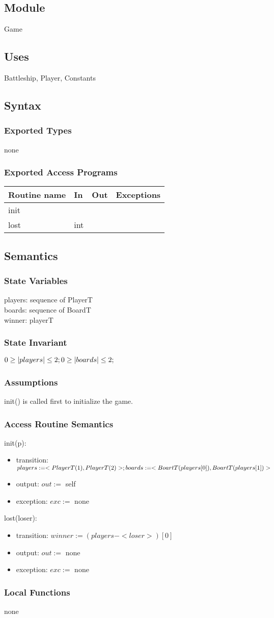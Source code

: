 \documentclass[12pt]{article}
\newcommand{\newModule}[9]{
	\subsection* {Module}
		#1
	\subsection* {Uses}
		#2
	\subsection* {Syntax}
		\subsubsection* {Exported Types}
			#3
		\subsubsection* {Exported Access Programs}
			#4
	\subsection* {Semantics}
		\subsubsection* {State Variables}
			#5
		\subsubsection* {State Invariant}
			#6
		\subsubsection* {Assumptions}
			#7
		\subsubsection* {Access Routine Semantics}
			#8
		\subsubsection* {Local Functions}
			#9
}
\newcommand{\newAccessProgram}[4]{
	\noindent #1:
		\begin{itemize}
			\item transition: #2
			\item output: $out :=$ #3
			\item exception: $exc :=$ #4
		\end{itemize}
}
\newcommand{\row}[4]{#1 & #2 & #3 & #4 ~\\ \hline}
\newcommand{\accessProgramsTableStart}{
\begin{tabular}{| l | l | l | l |}
\hline
\textbf{Routine name} & \textbf{In} & \textbf{Out} & \textbf{Exceptions}\\
\hline
}
\newcommand{\accessProgramsTableEnd}{
	\end{tabular}
}
\begin{document}
\newModule{Game}
	{%
		Battleship, Player, Constants
	}
	{%
		none
	}
	{%
		\accessProgramsTableStart
			\row{init}{}{}{}
			\row{lost}{int}{}{}
		\accessProgramsTableEnd
	}
	{%
		players: sequence of PlayerT \\
		boards: sequence of BoardT \\
		winner: playerT \\
	}
	{%
		$0 \geq |players| \leq 2; \\
		0 \geq |boards| \leq 2;$
	}
	{%
		init() is called first to initialize the game.
	}
	{%
		\newAccessProgram{init(p)}
			{%
				$ 
					players := <PlayerT(1), PlayerT(2)>; \\
					boards  := <BoartT(players[0]), BoartT(players[1])> \\
				$
			}
			{%
				self
			}
			{%
				none
			}
		\newAccessProgram{lost(loser)}
			{%
				$winner := (players - <loser>)[0]$
			}
			{%
				none
			}
			{%
				none
			}	
	}
	{%
	none
	}



\end{document}

